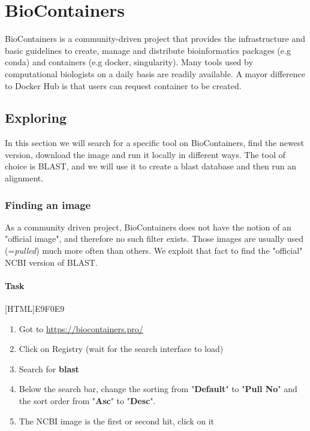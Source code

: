 \documentclass[12pt]{article}
\begin{document}
		

	\section{BioContainers}
		BioContainers is a community-driven project that provides the infrastructure and basic guidelines to create, manage and distribute bioinformatics packages (e.g conda) and containers (e.g docker, singularity).
		Many tools used by computational biologists on a daily basis are readily available.
		A mayor difference to Docker Hub is that users can request container to be created. 
		
		
		\subsection{Exploring}
			In this section we will search for a specific tool on BioContainers, find the newest version, download the image and run it locally in different ways. 
			The tool of choice is BLAST, and we will use it to create a blast database and then run an alignment. 
			
			\subsubsection{Finding an image} 
				As a community driven project, BioContainers does not have the notion of an "official image", and therefore no such filter exists.
				Those images are usually used (=\textit{pulled}) much more often than others.
				We exploit that fact to find the "official" NCBI version of BLAST.

				\paragraph{Task}
					[HTML]{E9F0E9}{\parbox{\linewidth}{%
							\begin{enumerate}
								\item Got to \url{https://biocontainers.pro/}
								\item Click on Registry (wait for the search interface to load)
								\item Search for \textbf{blast}
								\item Below the search bar, change the sorting from "\textbf{Default}" to "\textbf{Pull No}" and the sort order from "\textbf{Asc}" to "\textbf{Desc}".
								\item The NCBI image is the first or second hit, click on it
							\end{enumerate}
					}}
				
\end{document}
